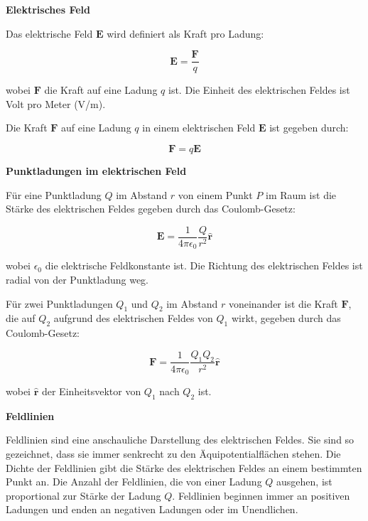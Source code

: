 \documentclass{article}
\begin{document}
\textbf{Elektrisches Feld}

Das elektrische Feld $\mathbf{E}$ wird definiert als Kraft pro Ladung:

\begin{equation}
\mathbf{E} = \frac{\mathbf{F}}{q}
\end{equation}

wobei $\mathbf{F}$ die Kraft auf eine Ladung $q$ ist. Die Einheit des elektrischen Feldes ist Volt pro Meter (V/m).

Die Kraft $\mathbf{F}$ auf eine Ladung $q$ in einem elektrischen Feld $\mathbf{E}$ ist gegeben durch:

\begin{equation}
\mathbf{F} = q\mathbf{E}
\end{equation}

\textbf{Punktladungen im elektrischen Feld}

Für eine Punktladung $Q$ im Abstand $r$ von einem Punkt $P$ im Raum ist die Stärke des elektrischen Feldes gegeben durch das Coulomb-Gesetz:

\begin{equation}
\mathbf{E} = \frac{1}{4\pi\epsilon_0}\frac{Q}{r^2}\hat{\mathbf{r}}
\end{equation}

wobei $\epsilon_0$ die elektrische Feldkonstante ist. Die Richtung des
elektrischen Feldes ist radial von der Punktladung weg.

Für zwei Punktladungen $Q_1$ und $Q_2$ im Abstand $r$ voneinander ist die Kraft $\mathbf{F}$, die auf $Q_2$ aufgrund des elektrischen Feldes von $Q_1$ wirkt, gegeben durch das Coulomb-Gesetz:

\begin{equation}
\mathbf{F} = \frac{1}{4\pi\epsilon_0}\frac{Q_1Q_2}{r^2}\hat{\mathbf{r}}
\end{equation}

wobei $\hat{\mathbf{r}}$ der Einheitsvektor von $Q_1$ nach $Q_2$ ist.

\textbf{Feldlinien}

Feldlinien sind eine anschauliche Darstellung des elektrischen Feldes. Sie sind
so gezeichnet, dass sie immer senkrecht zu den Äquipotentialflächen stehen. Die
Dichte der Feldlinien gibt die Stärke des elektrischen Feldes an einem
bestimmten Punkt an. Die Anzahl der Feldlinien, die von einer Ladung $Q$
ausgehen, ist proportional zur Stärke der Ladung $Q$. Feldlinien beginnen immer
an positiven Ladungen und enden an negativen Ladungen oder im Unendlichen.
\end{document}

